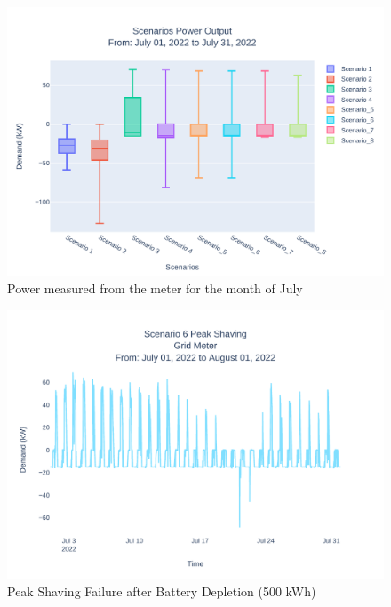 \documentclass[conference]{IEEEtran}
\begin{document}
	\begin{figure}
		\centering
		\includegraphics[width=1\linewidth]{Fig/4_Scn_Output_Run_3_Jul_01_2022_to_Jul_31_2022}
		\caption{Power measured from the meter for the month of July}
		\label{fig:4scnoutputrun2jul012022tojul312022}
	\end{figure}
	\begin{figure}
		\centering
		\includegraphics[width=1\linewidth]{Fig/scenario_6_peak_shaving}
		\caption{Peak Shaving Failure after Battery Depletion (500 kWh)}
		\label{fig:scenario3peakshaving}
	\end{figure}
\end{document}
